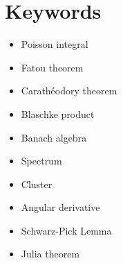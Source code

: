%
%
%
%
%

\chapter{Keywords}

\begin{itemize}
    \item Poisson integral
    \item Fatou theorem
    \item Carathéodory theorem
    \item Blaschke product
    \item Banach algebra
    \item Spectrum
    \item Cluster
    \item Angular derivative
    \item Schwarz-Pick Lemma
    \item Julia theorem
\end{itemize}

\endinput

